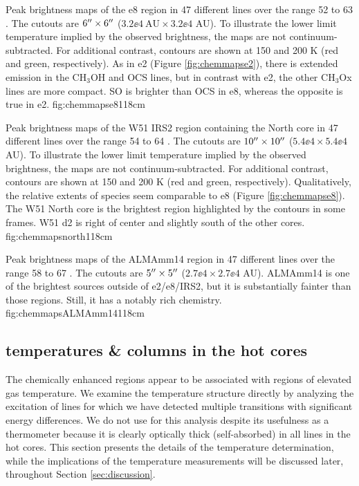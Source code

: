 \documentclass[twocolumn]{aastex61}
\begin{document}
{Peak brightness maps of the e8 region in 47 different lines over the range 52 to 63
\kms.
The cutouts are $6\mbox{$^{\prime\prime}$}\times6\mbox{$^{\prime\prime}$}$ ($3.2\ee{4}\mathrm{~AU}\times3.2\ee{4}$ AU).
To illustrate the lower limit temperature implied by the observed brightness,
the maps are not continuum-subtracted.  
For additional contrast, contours are shown at 150 and 200 K
(red and green, respectively).
As in e2 (Figure \ref{fig:chemmapse2}),
there is extended emission in the CH$_3$OH and OCS lines, but in contrast with e2,
the other CH$_3$Ox lines are more compact. SO is brighter than OCS in e8,
whereas the opposite is true in e2.
}{fig:chemmapse8}{1}{18cm}

{Peak brightness maps of the W51 IRS2 region containing the North core in 47
different lines over the range 54 to 64 \kms.  The cutouts
are $10\mbox{$^{\prime\prime}$}\times10\mbox{$^{\prime\prime}$}$ ($5.4\ee{4}\times5.4\ee{4}$ AU).  To illustrate
the lower limit temperature implied by the observed brightness, the maps are
not continuum-subtracted.  For additional contrast, contours are shown at 150
and 200 K (red and green, respectively).  Qualitatively, the relative extents
of species seem comparable to e8 (Figure \ref{fig:chemmapse8}).  
The W51 North core is the brightest region highlighted by the contours in some
frames.  W51 d2 is right of center and slightly south of the other cores.
}{fig:chemmapsnorth}{1}{18cm}

{Peak brightness maps of the ALMAmm14 region in 47 different lines over the
range 58 to 67 \kms.
The cutouts are $5\mbox{$^{\prime\prime}$}\times5\mbox{$^{\prime\prime}$}$ ($2.7\ee{4}\times2.7\ee{4}$ AU).
ALMAmm14 is one of the brightest sources outside of
e2/e8/IRS2, but it is substantially fainter than those regions.  Still, it has
a notably rich chemistry.
}{fig:chemmapsALMAmm14}{1}{18cm}


\subsection{\methanol temperatures \& columns in the hot cores}
\label{sec:ch3ohtem}
\label{sec:methanol}
The  chemically enhanced regions appear to be associated with regions of
elevated gas temperature.  We examine the temperature structure directly by
analyzing the excitation of lines for which we have detected multiple
transitions with significant energy differences.  We do not use \formaldehyde
for this analysis despite its usefulness as a thermometer because it is clearly
optically thick (self-absorbed) in all lines in the hot cores.
This section presents the details of the temperature determination, while 
the implications of the temperature measurements will be discussed later,
throughout Section \ref{sec:discussion}.
\end{document}
